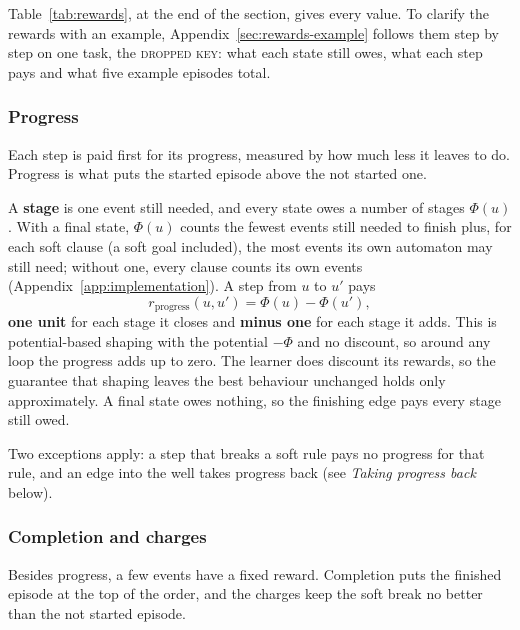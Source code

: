 \documentclass[11pt,english,listoffigures,listoftables]{tfgetsinf}
\newcommand{\runex}[1]{\textsc{#1}}  %
\newcommand{\gain}[1]{\textcolor{green!40!black}{\bfseries\boldmath #1}}  %
\newcommand{\loss}[1]{\textcolor{red!60!black}{\bfseries\boldmath #1}}  %
\begin{document}
Table~\ref{tab:rewards}, at the end of the section, gives every value. To clarify the rewards with an example, Appendix~\ref{sec:rewards-example} follows them step by step on one task, the \runex{dropped key}: what each state still owes, what each step pays and what five example episodes total.

\subsubsection{Progress}
Each step is paid first for its progress, measured by how much less it leaves to do. Progress is what puts the started episode above the not started one. 

A \textbf{stage} is one event still needed, and every state owes a number of stages $\Phi(u)$. With a final state, $\Phi(u)$ counts the fewest events still needed to finish plus, for each soft clause (a soft goal included), the most events its own automaton may still need; without one, every clause counts its own events (Appendix~\ref{app:implementation}). A step from $u$ to $u'$ pays
\[ r_{\mathrm{progress}}(u,u') = \Phi(u) - \Phi(u'), \]
\gain{one unit} for each stage it closes and \loss{minus one} for each stage it adds. This is potential-based shaping \cite{ng1999policy} with the potential $-\Phi$ and no discount, so around any loop the progress adds up to zero. The learner does discount its rewards, so the guarantee that shaping leaves the best behaviour unchanged holds only approximately. A final state owes nothing, so the finishing edge pays every stage still owed. 

Two exceptions apply: a step that breaks a soft rule pays no progress for that rule, and an edge into the well takes progress back (see \emph{Taking progress back} below).

\subsubsection{Completion and charges}
Besides progress, a few events have a fixed reward. Completion puts the finished episode at the top of the order, and the charges keep the soft break no better than the not started episode. 
\end{document}
